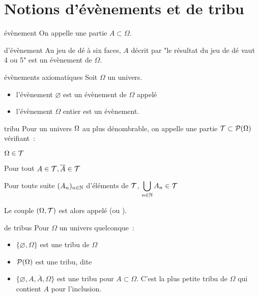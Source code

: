 \section{Notions d'évènements et de tribu}

\begin{definition}{}{évènement}
    On appelle  une partie $A \subset \Omega$.
\end{definition}

\begin{exemple}{}{d'évènement}
    Au jeu de dé à six faces, $A$ décrit par "le résultat du jeu de dé vaut 4 ou 5" est un évènement de $\Omega$.
\end{exemple}

\begin{proposition}{}{évènements axiomatiques}
    Soit $\Omega$ un univers.
    \begin{itemize}
        \item l'évènement $\varnothing$ est un évènement de $\Omega$ appelé 
        \item l'évènement $\Omega$ entier est un évènement.
    \end{itemize}
\end{proposition}

\begin{definition}{}{tribu}
    Pour un univers $\Omega$ au plus dénombrable, on appelle  une partie $\mathcal{T} \subset \mathcal{P}(\Omega)$ vérifiant~:
    \begin{enumeratebf}
        \item $\Omega \in \mathcal{T}$
        \item Pour tout $A \in \mathcal{T}, \overline{A} \in \mathcal{T}$
        \item Pour toute suite $(A_n)_{n \in \mathbb{N}}$ d'éléments de $\mathcal{T}$, $\displaystyle \bigcup_{n \in \mathbb{N}}A_n \in \mathcal{T}$
    \end{enumeratebf}
    Le couple $(\Omega, \mathcal{T})$ est alors appelé  (ou ).
\end{definition}

\begin{exemple}{}{de tribus}
    Pour $\Omega$ un univers quelconque~:
    \begin{itemize}
        \item $\{\varnothing, \Omega\}$ est une tribu de $\Omega$
        \item $\mathcal{P}(\Omega)$ est une tribu, dite 
        \item $\{\varnothing, A, \overline{A}, \Omega\}$ est une tribu pour $A \subset \Omega$. C'est la plus petite tribu de $\Omega$ qui contient $A$ pour l'inclusion.
    \end{itemize}
\end{exemple}

